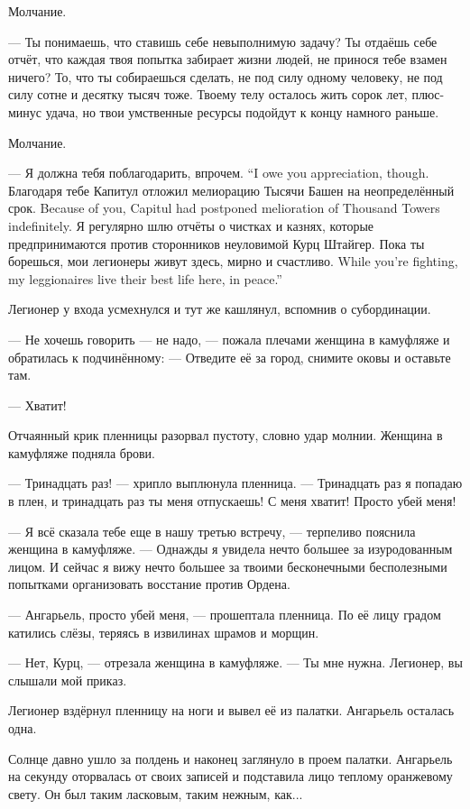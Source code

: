 Молчание.

--- Ты понимаешь, что ставишь себе невыполнимую задачу?
Ты отдаёшь себе отчёт, что каждая твоя попытка забирает жизни людей, не принося тебе взамен ничего?
То, что ты собираешься сделать, не под силу одному человеку, не под силу сотне и десятку тысяч тоже.
Твоему телу осталось жить сорок лет, плюс-минус удача, но твои умственные ресурсы подойдут к концу намного раньше.

Молчание.

{--- Я должна тебя поблагодарить, впрочем.}
{``I owe you appreciation, though.}
{Благодаря тебе Капитул отложил мелиорацию Тысячи Башен на неопределённый срок.}
{Because of you, Capitul had postponed melioration of Thousand Towers indefinitely.}
Я регулярно шлю отчёты о чистках и казнях, которые предпринимаются против сторонников неуловимой Курц Штайгер.
{Пока ты борешься, мои легионеры живут здесь, мирно и счастливо.}
{While you're fighting, my leggionaires live their best life here, in peace.''}

Легионер у входа усмехнулся и тут же кашлянул, вспомнив о субординации.

--- Не хочешь говорить --- не надо, --- пожала плечами женщина в камуфляже и обратилась к подчинённому:
--- Отведите её за город, снимите оковы и оставьте там.

--- Хватит!

Отчаянный крик пленницы разорвал пустоту, словно удар молнии.
Женщина в камуфляже подняла брови.

--- Тринадцать раз! --- хрипло выплюнула пленница.
--- Тринадцать раз я попадаю в плен, и тринадцать раз ты меня отпускаешь!
С меня хватит!
Просто убей меня!

--- Я всё сказала тебе еще в нашу третью встречу, --- терпеливо пояснила женщина в камуфляже.
--- Однажды я увидела нечто большее за изуродованным лицом.
И сейчас я вижу нечто большее за твоими бесконечными бесполезными попытками организовать восстание против Ордена.

--- Ангарьель, просто убей меня, --- прошептала пленница.
По её лицу градом катились слёзы, теряясь в извилинах шрамов и морщин.

--- Нет, Курц, --- отрезала женщина в камуфляже.
--- Ты мне нужна.
Легионер, вы слышали мой приказ.

Легионер вздёрнул пленницу на ноги и вывел её из палатки.
Ангарьель осталась одна.

Солнце давно ушло за полдень и наконец заглянуло в проем палатки.
Ангарьель на секунду оторвалась от своих записей и подставила лицо теплому оранжевому свету.
Он был таким ласковым, таким нежным, как...

